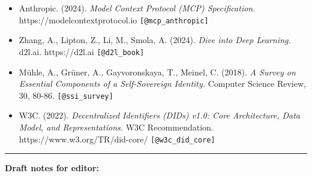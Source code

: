 \begin{itemize}
  Commercial product documentation. https://hiddenlayer.com
  \texttt{{[}@hiddenlayer{]}}
\item
  Anthropic. (2024). \emph{Model Context Protocol (MCP) Specification.}
  https://modelcontextprotocol.io \texttt{{[}@mcp\_anthropic{]}}
\item
  Zhang, A., Lipton, Z., Li, M., Smola, A. (2024). \emph{Dive into Deep
  Learning.} d2l.ai. https://d2l.ai \texttt{{[}@d2l\_book{]}}
\item
  Mühle, A., Grüner, A., Gayvoronskaya, T., Meinel, C. (2018). \emph{A
  Survey on Essential Components of a Self-Sovereign Identity.} Computer
  Science Review, 30, 80-86. \texttt{{[}@ssi\_survey{]}}
\item
  W3C. (2022). \emph{Decentralized Identifiers (DIDs) v1.0: Core
  Architecture, Data Model, and Representations.} W3C Recommendation.
  https://www.w3.org/TR/did-core/ \texttt{{[}@w3c\_did\_core{]}}
\end{itemize}

\begin{center}\rule{0.5\linewidth}{0.5pt}\end{center}

\textbf{Draft notes for editor:}

